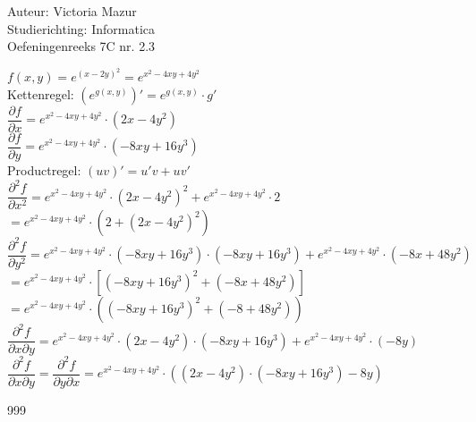\documentclass[a4paper]{article}
\begin{document}
  
\noindent \large Auteur: Victoria Mazur \\
\noindent \large Studierichting: Informatica\\
\noindent \large Oefeningenreeks 7C nr. 2.3\\

\medskip

\normalsize

$f(x, y) = e^{(x-2y)^2} = e^{x^2-4xy+4y^2}$ \\

Kettenregel: $(e^{g(x,y)})' = e^{g(x,y)} \cdot g'$ \\

$\dfrac{\partial f}{\partial x} = e^{x^2-4xy+4y^2} \cdot (2x - 4y^2)$ \\

$\dfrac{\partial f}{\partial y} = e^{x^2-4xy+4y^2} \cdot (-8xy + 16y^3)$ \\

Productregel: $(uv)' = u'v + uv'$ \\

$\dfrac{\partial^2 f}{\partial x^2} = e^{x^2-4xy+4y^2} \cdot (2x - 4y^2)^2 + e^{x^2-4xy+4y^2} \cdot 2$ \\

$= e^{x^2-4xy+4y^2} \cdot (2 + (2x - 4y^2)^2)$ \\

$\dfrac{\partial^2 f}{\partial y^2} = e^{x^2-4xy+4y^2} \cdot (-8xy + 16y^3) \cdot (-8xy + 16y^3) + e^{x^2-4xy+4y^2} \cdot (-8x + 48y^2)$ \\

$= e^{x^2-4xy+4y^2} \cdot [(-8xy + 16y^3)^2 + (-8x + 48y^2)]$ \\

$= e^{x^2-4xy+4y^2} \cdot ((-8xy + 16y^3)^2 + (-8 + 48y^2))$ \\

$\dfrac{\partial^2 f}{\partial x \partial y} = e^{x^2-4xy+4y^2} \cdot (2x - 4y^2) \cdot (-8xy + 16y^3) + e^{x^2-4xy+4y^2} \cdot (-8y)$ \\

$\dfrac{\partial^2 f}{\partial x \partial y} = \dfrac{\partial^2 f}{\partial y \partial x} = e^{x^2-4xy+4y^2} \cdot ((2x - 4y^2) \cdot (-8xy + 16y^3) - 8y)$ \\

\begin{thebibliography}{999}
\end{thebibliography}
\end{document}
